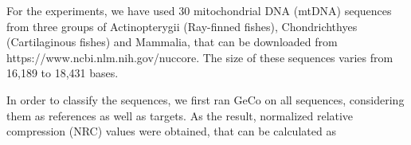 \documentclass[extendedabs]{recpad2k}
\begin{document}
For the experiments, we have used 30 mitochondrial DNA (mtDNA) sequences from three groups of Actinopterygii (Ray-finned fishes), Chondrichthyes (Cartilaginous fishes) and Mammalia, that can be downloaded from https://www.ncbi.nlm.nih.gov/nuccore. The size of these sequences varies from 16,189 to 18,431 bases.

In order to classify the sequences, we first ran GeCo on all sequences, considering them as references as well as targets. As the result, normalized relative compression (NRC) values were obtained, that can be calculated as



\end{document}
